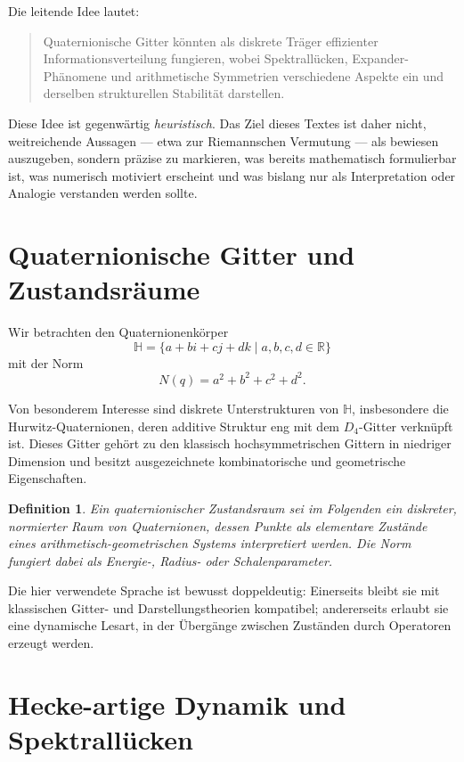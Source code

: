 \documentclass[12pt,a4paper]{article}
\newtheorem{definition}[theorem]{Definition}
\begin{document}
	Die leitende Idee lautet:
	\begin{quote}
		Quaternionische Gitter könnten als diskrete Träger effizienter Informationsverteilung fungieren, wobei Spektrallücken, Expander-Phänomene und arithmetische Symmetrien verschiedene Aspekte ein und derselben strukturellen Stabilität darstellen.
	\end{quote}
	
	Diese Idee ist gegenwärtig \emph{heuristisch}. Das Ziel dieses Textes ist daher nicht, weitreichende Aussagen --- etwa zur Riemannschen Vermutung --- als bewiesen auszugeben, sondern präzise zu markieren, was bereits mathematisch formulierbar ist, was numerisch motiviert erscheint und was bislang nur als Interpretation oder Analogie verstanden werden sollte.
	
	\section{Quaternionische Gitter und Zustandsräume}
	
	Wir betrachten den Quaternionenkörper
	\[
	\mathbb{H} = \{a + bi + cj + dk \mid a,b,c,d \in \mathbb{R}\}
	\]
	mit der Norm
	\[
	N(q) = a^2 + b^2 + c^2 + d^2.
	\]
	
	Von besonderem Interesse sind diskrete Unterstrukturen von $\mathbb{H}$, insbesondere die Hurwitz-Quaternionen, deren additive Struktur eng mit dem $D_4$-Gitter verknüpft ist. Dieses Gitter gehört zu den klassisch hochsymmetrischen Gittern in niedriger Dimension und besitzt ausgezeichnete kombinatorische und geometrische Eigenschaften.
	
	\begin{definition}
		Ein \emph{quaternionischer Zustandsraum} sei im Folgenden ein diskreter, normierter Raum von Quaternionen, dessen Punkte als elementare Zustände eines arithmetisch-geometrischen Systems interpretiert werden. Die Norm fungiert dabei als Energie-, Radius- oder Schalenparameter.
	\end{definition}
	
	Die hier verwendete Sprache ist bewusst doppeldeutig: Einerseits bleibt sie mit klassischen Gitter- und Darstellungstheorien kompatibel; andererseits erlaubt sie eine dynamische Lesart, in der Übergänge zwischen Zuständen durch Operatoren erzeugt werden.
	
	\section{Hecke-artige Dynamik und Spektrallücken}
	
\end{document}
